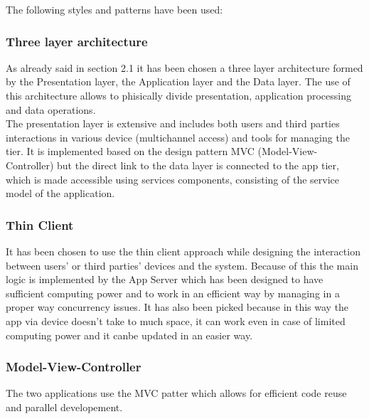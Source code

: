 The following styles and patterns have been used:

\subsubsection{Three layer architecture}
As already said in section 2.1 it has been chosen a three layer architecture formed by the Presentation layer, the Application layer and the Data layer. The use of this architecture allows to phisically divide presentation, application processing and data operations.\\
The presentation layer is extensive and includes both users and third parties interactions in various device (multichannel access) and tools for managing the tier. It is implemented based on the design pattern MVC (Model-View-Controller)  but the direct link to the data layer is connected to the app tier, which is made accessible using services components, consisting of the service model of the application.

\subsubsection{Thin Client}
It has been chosen to use the thin client approach while designing the interaction between users' or third parties' devices and the system. Because of this the main logic is implemented by the App Server which has been designed to have sufficient computing power and to work in an efficient way by managing in a proper way concurrency issues. It has also been picked because in this way the app via device doesn't take to much space, it can work even in case of limited computing power and it canbe updated in an easier way.

\subsubsection{Model-View-Controller}
The two applications use the MVC patter which allows for efficient code reuse and parallel developement.
